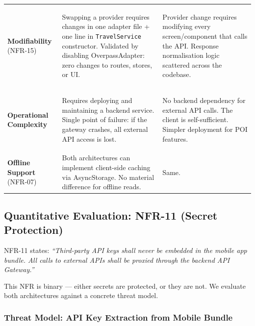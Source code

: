 \documentclass[12pt, a4paper]{article}
\newcommand{\code}[1]{\texttt{\small #1}}
\newcommand{\reqid}[1]{\textsc{\small #1}}
\begin{document}
\begin{longtable}{L{2.8cm} L{5.2cm} L{5.2cm}}
\textbf{Modifiability} (\reqid{NFR-15}) &
\begin{tcolorbox}[winbox]
Swapping a provider requires changes in one adapter file + one line in \code{TravelService} constructor. Validated by disabling OverpassAdapter: zero changes to routes, stores, or UI.
\end{tcolorbox} &
\begin{tcolorbox}[losebox]
Provider change requires modifying every screen/component that calls the API. Response normalisation logic scattered across the codebase.
\end{tcolorbox} \\

\textbf{Operational Complexity} &
\begin{tcolorbox}[losebox]
Requires deploying and maintaining a backend service. Single point of failure: if the gateway crashes, all external API access is lost.
\end{tcolorbox} &
\begin{tcolorbox}[winbox]
No backend dependency for external API calls. The client is self-sufficient. Simpler deployment for POI features.
\end{tcolorbox} \\

\textbf{Offline Support} (\reqid{NFR-07}) &
Both architectures can implement client-side caching via AsyncStorage. No material difference for offline reads. &
Same. \\

\end{longtable}

\subsection{Quantitative Evaluation: NFR-11 (Secret Protection)}

\reqid{NFR-11} states: \emph{``Third-party API keys shall never be embedded in the mobile app bundle. All calls to external APIs shall be proxied through the backend API Gateway.''}

This NFR is binary --- either secrets are protected, or they are not. We evaluate both architectures against a concrete threat model.

\subsubsection{Threat Model: API Key Extraction from Mobile Bundle}
\end{document}
